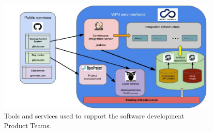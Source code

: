 \documentclass{article}
\begin{document}
\begin{figure}[h]
  \centering
  \includegraphics[width=\textwidth]{./figs/Figure7.pdf}
  \caption{Tools and services used to support the software development Product Teams.}
  \label{fig:7}
\end{figure}
\end{document}
